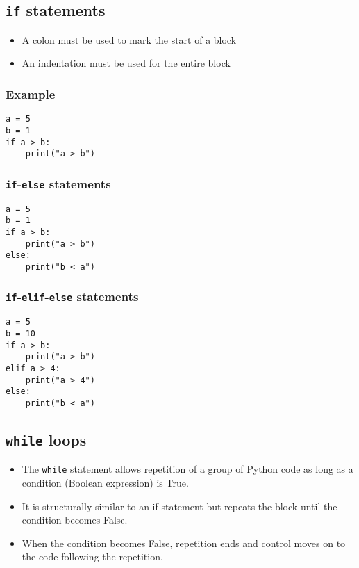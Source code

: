 \documentclass[11pt]{article}
\begin{document}
 \newpage

\subsection{\texttt{if} statements}
\label{sec:org42528e8}
\begin{itemize}
\item A colon must be used to mark the start of a block
\item An indentation must be used for the entire block
\end{itemize}

\subsubsection{Example}
\label{sec:orge2f0fcb}
\begin{verbatim}
a = 5
b = 1
if a > b:
    print("a > b")
\end{verbatim}

\subsubsection{\texttt{if}-\texttt{else} statements}
\label{sec:org9a1437b}
\begin{verbatim}
a = 5
b = 1
if a > b:
    print("a > b")
else:
    print("b < a")
\end{verbatim}

\subsubsection{\texttt{if}-\texttt{elif}-\texttt{else} statements}
\label{sec:org83c60b8}
\begin{verbatim}
a = 5
b = 10
if a > b:
    print("a > b")
elif a > 4:
    print("a > 4")
else:
    print("b < a")
\end{verbatim}

 \newpage

\subsection{\texttt{while} loops}
\label{sec:orgbf3ec7a}
\begin{itemize}
\item The \texttt{while} statement allows repetition of a group of Python code as long as a condition (Boolean expression) is True.
\item It is structurally similar to an if statement but repeats the block until the condition becomes False.
\item When the condition becomes False, repetition ends and control moves on to the code following the repetition.
\end{itemize}
\end{document}
